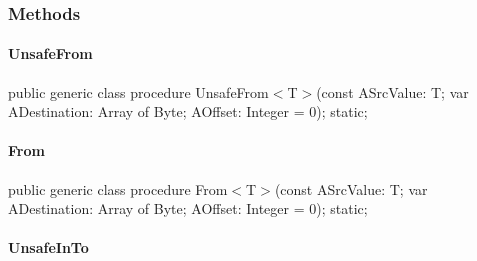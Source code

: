 \documentclass{report}
\begin{document}
\subsubsection*{\large{\textbf{Methods}}\normalsize\hspace{1ex}\hfill}
\paragraph*{UnsafeFrom}\hspace*{\fill}

\begin{list}{}{
\setlength{\itemindent}{0cm}
\setlength{\listparindent}{0cm}
\setlength{\leftmargin}{\evensidemargin}
\addtolength{\leftmargin}{\tmplength}
\settowidth{\labelsep}{X}
\addtolength{\leftmargin}{\labelsep}
\setlength{\labelwidth}{\tmplength}
}
\begin{flushleft}
\item[\textbf{Declaration}\hfill]
\begin{ttfamily}
public generic class procedure UnsafeFrom{$<$}T{$>$}(const ASrcValue: T; var ADestination: Array of Byte; AOffset: Integer = 0); static;\end{ttfamily}


\end{flushleft}
\end{list}
\paragraph*{From}\hspace*{\fill}

\begin{list}{}{
\setlength{\itemindent}{0cm}
\setlength{\listparindent}{0cm}
\setlength{\leftmargin}{\evensidemargin}
\addtolength{\leftmargin}{\tmplength}
\settowidth{\labelsep}{X}
\addtolength{\leftmargin}{\labelsep}
\setlength{\labelwidth}{\tmplength}
}
\begin{flushleft}
\item[\textbf{Declaration}\hfill]
\begin{ttfamily}
public generic class procedure From{$<$}T{$>$}(const ASrcValue: T; var ADestination: Array of Byte; AOffset: Integer = 0); static;\end{ttfamily}


\end{flushleft}
\end{list}
\paragraph*{UnsafeInTo}\hspace*{\fill}
\end{document}
